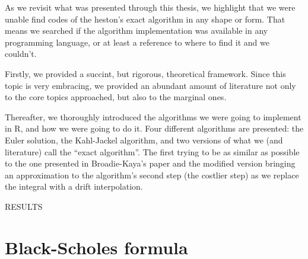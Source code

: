\documentclass[12pt,twoside]{reedthesis}
\theoremstyle{definition}
\theoremstyle{definition}
\theoremstyle{remark}
\begin{document}
  As we revisit what was presented through this thesis, we highlight that
  we were unable find codes of the heston's exact algorithm in any shape
  or form. That means we searched if the algorithm implementation was
  available in any programming language, or at least a reference to where
  to find it and we couldn't.
  
  Firstly, we provided a succint, but rigorous, theoretical framework.
  Since this topic is very embracing, we provided an abundant amount of
  literature not only to the core topics approached, but also to the
  marginal ones.
  
  Thereafter, we thoroughly introduced the algorithms we were going to
  implement in R, and how we were going to do it. Four different
  algorithms are presented: the Euler solution, the Kahl-Jackel algorithm,
  and two versions of what we (and literature) call the ``exact
  algorithm''. The first trying to be as similar as possible to the one
  presented in Broadie-Kaya's paper and the modified version bringing an
  approximation to the algorithm's second step (the costlier step) as we
  replace the integral with a drift interpolation.
  
  RESULTS
  
  \appendix
  
  \chapter{Black-Scholes formula}\label{bsformula}
  
\end{document}
